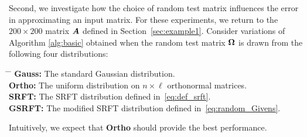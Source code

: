 \documentclass[final]{siamltex}
\begin{document}
Second, we investigate how the choice of random test matrix influences the
error in approximating an input matrix.  For these experiments, we return to
the $200 \times 200$ matrix $\bm{A}$ defined in Section~\ref{sec:example1}.
Consider variations of Algorithm \ref{alg:basic} obtained when
the random test matrix $\bm{\Omega}$ is drawn from the following four distributions:

\lsp

\begin{tabbing}
\mbox{}\hspace{5mm}\= \hspace{17mm} \= \kill
\> \textbf{Gauss:} \> The standard Gaussian distribution.\\[1mm]
\> \textbf{Ortho:} \> The uniform distribution on $n \times \ell$ orthonormal matrices.\\[1mm]
\> \textbf{SRFT:}  \> The SRFT distribution defined in~\eqref{eq:def_srft}.\\[1mm]
\> \textbf{GSRFT:} \>  The modified SRFT distribution defined in~\eqref{eq:random_Givens}.
\end{tabbing}

\lsp

\noindent
Intuitively, we expect that {\bf Ortho} should provide the best performance.

\end{document}
